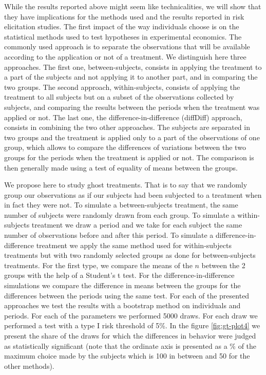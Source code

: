 \documentclass[
]{book}
\begin{document}
While the results reported above might seem like technicalities, we will show
that they have implications for the methods used and the results reported in
risk elicitation studies.
The first impact of the way individuals choose is on the statistical methods
used to test hypotheses in experimental economics.
The commonly used approach is to
separate the observations that will be available according to the
application or not of a treatment. We distinguish here three approaches.
The first one, between-subjects, consists in applying the
treatment to a part of the subjects and not applying it to another part,
and in comparing the two groups. The second approach, within-subjects,
consists of applying the treatment to all subjects but on a subset of
the observations collected by subjects, and comparing the results
between the periods when the treatment was applied or not. The last one,
the difference-in-difference (diffDiff) approach, consists in combining
the two other approaches. The subjects are separated in two groups and
the treatment is applied only to a part of the observations of one
group, which allows to compare the differences of variations between the
two groups for the periods when the treatment is applied or not. The
comparison is then generally made using a test of equality of means
between the groups.

We propose here to study ghost treatments. That is to say that we randomly group
our observations as if our subjects had been subjected
to a treatment when in fact they were not.
To simulate a between-subjects treatment, the same number of subjects
were randomly drawn from each group.
To simulate a within-subjects treatment we draw a
period and we take for each subject the same number of observations
before and after this period.
To simulate a difference-in-difference
treatment we apply the same method used for within-subjects treatments but with
two randomly selected groups as done for between-subjects treatments.
For the first type, we
compare the means of the \(n\) between the 2 groups with the help of a
Student's t test. For the difference-in-difference simulations we
compare the difference in means between the groups for the differences
between the periods using the same test. For each of the presented
approaches we test the results with a bootstrap method on individuals
and periods.
For each of the parameters we performed 5000 draws.
For each draw we performed a test with a type I risk threshold of 5\%.
In the figure \ref{fig:gt-plot4} we present the share of the draws for which the
differences in behavior were judged as statistically significant (note
that the ordinate axis is presented as a \% of the maximum choice made by
the subjects which is 100 in between and 50 for the other methods).
\end{document}
